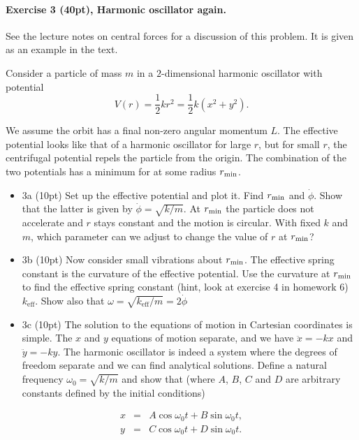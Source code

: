 \documentclass[%
oneside,                 %
final,                   %
10pt]{article}
\begin{document}
\noindent
\paragraph{Exercise 3 (40pt), Harmonic oscillator again.}
See the lecture notes on central forces for a discussion of this problem. It is given as an example in the text.

Consider a particle of mass $m$ in a $2$-dimensional harmonic oscillator with potential
\[
V(r)=\frac{1}{2}kr^2=\frac{1}{2}k(x^2+y^2).
\]

We assume the orbit has a final non-zero angular momentum $L$.  The
effective potential looks like that of a harmonic oscillator for large
$r$, but for small $r$, the centrifugal potential repels the particle
from the origin. The combination of the two potentials has a minimum
for at some radius $r_{\rm min}$.


\begin{itemize}
\item 3a (10pt) Set up the effective potential and plot it. Find $r_{\rm min}$ and $\dot{\phi}$. Show that the latter is given by $\dot{\phi}=\sqrt{k/m}$.  At $r_{\rm min}$ the particle does not accelerate and $r$ stays constant and the motion is circular. With fixed $k$ and $m$, which parameter can we adjust to change the value of $r$ at $r_{\rm min}$?

\item 3b (10pt) Now consider small vibrations about $r_{\rm min}$. The effective spring constant is the curvature of the effective potential.  Use the curvature at $r_{\rm min}$ to find the effective spring constant (hint, look at  exercise 4 in homework 6) $k_{\mathrm{eff}}$. Show also that $\omega=\sqrt{k_{\mathrm{eff}}/m}=2\dot{\phi}$  

\item 3c (10pt) The solution to the equations of motion in Cartesian coordinates is simple. The $x$ and $y$ equations of motion separate, and we have $\ddot{x}=-kx$ and $\ddot{y}=-ky$. The harmonic oscillator is indeed a system where the degrees of freedom separate and we can find analytical solutions. Define a natural frequency $\omega_0=\sqrt{k/m}$ and show that (where $A$, $B$, $C$ and $D$ are arbitrary constants defined by the initial conditions)
\end{itemize}

\noindent
\begin{eqnarray*}
x&=&A\cos\omega_0 t+B\sin\omega_0 t,\\
y&=&C\cos\omega_0 t+D\sin\omega_0 t.
\end{eqnarray*}
\end{document}
